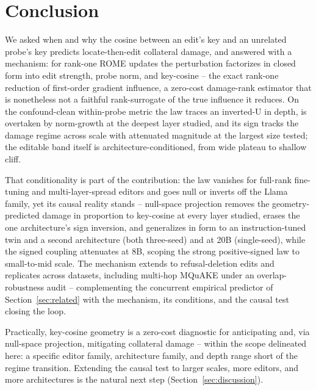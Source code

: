\section{Conclusion}
\label{sec:conclusion}

We asked when and why the cosine between an edit's key and an unrelated
probe's key predicts locate-then-edit collateral damage, and answered with a
mechanism: for rank-one ROME updates the perturbation factorizes in closed
form into edit strength, probe norm, and key-cosine -- the exact rank-one
reduction of first-order gradient influence, a zero-cost damage-rank estimator that
is nonetheless not a faithful rank-surrogate of the true influence it reduces.
On the confound-clean within-probe metric the law traces an inverted-U in
depth, is overtaken by norm-growth at the deepest layer studied, and its sign
tracks the damage regime across scale with attenuated magnitude at the largest
size tested; the editable band itself is architecture-conditioned, from wide
plateau to shallow cliff.

That conditionality is part of the contribution: the law vanishes for
full-rank fine-tuning and multi-layer-spread editors and goes null or inverts
off the Llama family, yet its causal reality stands -- null-space projection
removes the geometry-predicted damage in proportion to key-cosine at every
layer studied, erases the one architecture's sign inversion, and generalizes
in form to an instruction-tuned twin and a second architecture (both
three-seed) and at 20B (single-seed), while the signed coupling attenuates
at 8B, scoping the
strong positive-signed law to small-to-mid scale. The mechanism extends to
refusal-deletion edits and replicates across datasets, including multi-hop
MQuAKE under an overlap-robustness audit -- complementing the concurrent
empirical predictor of Section~\ref{sec:related} with the mechanism, its
conditions, and the causal test closing the loop.

Practically, key-cosine geometry is a zero-cost diagnostic for anticipating
and, via null-space projection, mitigating collateral damage -- within the
scope delineated here: a specific editor family, architecture family, and depth
range short of the regime transition. Extending the causal test to larger
scales, more editors, and more architectures is the natural next step
(Section~\ref{sec:discussion}).
